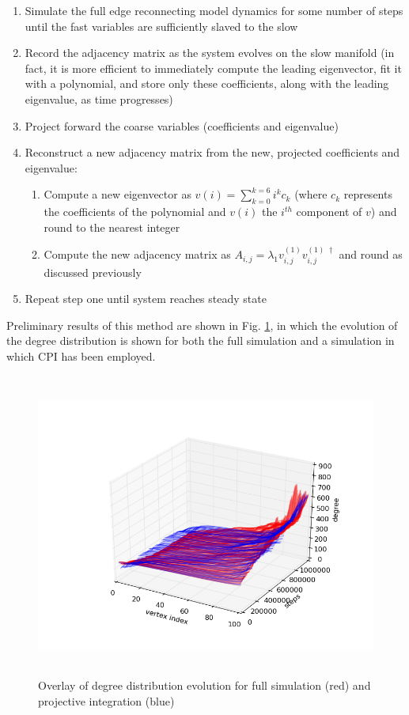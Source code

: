 \documentclass[11pt]{article}
\begin{document}
\begin{enumerate}
\item Simulate the full edge reconnecting model dynamics for some number of steps until the fast variables are sufficiently slaved to the slow
\item Record the adjacency matrix as the system evolves on the slow manifold (in fact, it is more efficient to immediately compute the leading eigenvector, fit it with a polynomial, and store only these coefficients, along with the leading eigenvalue, as time progresses)
\item Project forward the coarse variables (coefficients and eigenvalue)
\item Reconstruct a new adjacency matrix from the new, projected coefficients and eigenvalue:
  \begin{enumerate}
  \item Compute a new eigenvector as $v(i) = \displaystyle\sum\limits_{k=0}^{k=6} i^{k}c_{k}$ (where $c_{k}$ represents the coefficients of the polynomial and $v(i)$ the $i^{th}$ component of $v$) and round to the nearest integer
  \item Compute the new adjacency matrix as $A_{i,j}=\lambda_{1}v^{(1)}_{i,j}v^{(1) \;\dagger}_{i,j}$ and round as discussed previously
  \end{enumerate}
\item Repeat step one until system reaches steady state
\end{enumerate}

Preliminary results of this method are shown in Fig. \ref{fig:CPI}, in which the evolution of the degree distribution is shown for both the full simulation and a simulation in which CPI has been employed.

\begin{figure}[h]
  \centering
  \includegraphics[height=10cm]{CPI}
  \caption{Overlay of degree distribution evolution for full simulation (red) and projective integration (blue)}
  \label{fig:CPI}
\end{figure}
\end{document}
